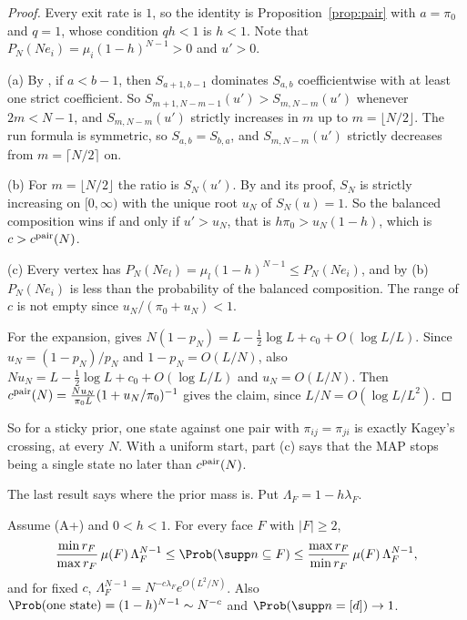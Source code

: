 \begin{proof}
Every exit rate is $1$, so the identity is Proposition~\ref{prop:pair} with
$a=\pi_0$ and $q=1$, whose condition $qh<1$ is $h<1$. Note that
$P_N(Ne_i)=\mu_i(1-h)^{N-1}>0$ and $u'>0$.

(a) By \cite[Proposition~6.1]{paperA}, if $a<b-1$, then $S_{a+1,b-1}$
dominates $S_{a,b}$ coefficientwise with at least one strict coefficient.
So $S_{m+1,N-m-1}(u')>S_{m,N-m}(u')$ whenever $2m<N-1$, and $S_{m,N-m}(u')$
strictly increases in $m$ up to $m=\lfloor N/2\rfloor$. The run formula is
symmetric, so $S_{a,b}=S_{b,a}$, and $S_{m,N-m}(u')$ strictly decreases from
$m=\lceil N/2\rceil$ on.

(b) For $m=\lfloor N/2\rfloor$ the ratio is $S_N(u')$. By
\cite[Theorem~5.1]{paperA} and its proof, $S_N$ is strictly increasing on
$[0,\infty)$ with the unique root $u_N$ of $S_N(u)=1$. So the balanced
composition wins if and only if $u'>u_N$, that is $h\pi_0>u_N(1-h)$, which
is $c>c^{\rm pair}(N)$.

(c) Every vertex has $P_N(Ne_l)=\mu_l(1-h)^{N-1}\le P_N(Ne_i)$, and by (b)
$P_N(Ne_i)$ is less than the probability of the balanced composition. The
range of $c$ is not empty since $u_N/(\pi_0+u_N)<1$.

For the expansion, \cite[Theorem~5.2]{paperA} gives
$N(1-p_N)=L-\frac12\log L+c_0+O(\log L/L)$. Since $u_N=(1-p_N)/p_N$ and
$1-p_N=O(L/N)$, also $Nu_N=L-\frac12\log L+c_0+O(\log L/L)$ and
$u_N=O(L/N)$. Then
$c^{\rm pair}(N)=\frac{Nu_N}{\pi_0L}(1+u_N/\pi_0)^{-1}$ gives the claim,
since $L/N=O(\log L/L^2)$.
\end{proof}

So for a sticky prior, one state against one pair with $\pi_{ij}=\pi_{ji}$
is exactly Kagey's crossing, at every $N$. With a uniform start, part
(c) says that the MAP stops being a single state no later than
$c^{\rm pair}(N)$.

The last result says where the prior mass is. Put $\Lambda_F=1-h\lambda_F$.

\begin{proposition}\label{prop:mass}
Assume \textup{(A+)} and $0<h<1$. For every face $F$ with
$\lvert F\rvert\ge2$,
\[
 \frac{\min r_F}{\max r_F}\,\mu(F)\,\Lambda_F^{N-1}
 \le\Prob(\supp n\subseteq F)\le
 \frac{\max r_F}{\min r_F}\,\mu(F)\,\Lambda_F^{N-1},
\]
and for fixed $c$, $\Lambda_F^{N-1}=N^{-c\lambda_F}e^{O(L^2/N)}$. Also
$\Prob(\text{one state})=(1-h)^{N-1}\sim N^{-c}$ and
$\Prob(\supp n=[d])\to1$.
\end{proposition}

